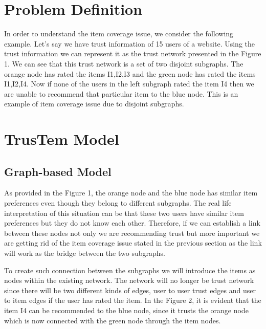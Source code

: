 \documentclass[11pt, conference, onecolumn]{IEEEtran}
\begin{document}
\section{Problem Definition} \label{sec:problem}


In order to understand the item coverage issue, we consider the following example. Let's say we have trust information of 15 users of a website. Using the trust information we can represent it as the trust network presented in the Figure 1. We can see that this trust network is a set of two disjoint subgraphs. The orange node has rated the items I1,I2,I3 and the green node has rated the items I1,I2,I4. Now if none of the users in the left subgraph rated the item I4 then we are unable to recommend that particular item to the blue node. This is an example of item coverage issue due to disjoint subgraphs. 


\section{TrusTem Model} \label{sec:solution}

\subsection{Graph-based Model}
As provided in the Figure 1, the orange node and the blue node has similar item preferences even though they belong to different subgraphs. The real life interpretation of this situation can be that these two users have similar item preferences but they do not know each other. Therefore, if we can establish a link between these nodes not only we are recommending trust but more important we are getting rid of the item coverage issue stated in the previous section as the link will work as the bridge between the two subgraphs.

To create such connection between the subgraphs we will introduce the items as nodes within the existing network. The network will no longer be trust network since there will be two different kinds of edges, user to user trust edges and user to item edges if the user has rated the item. In the Figure 2, it is evident that the item I4 can be recommended to the blue node, since it trusts the orange node which is now connected with the green node through the item nodes. 
\end{document}
